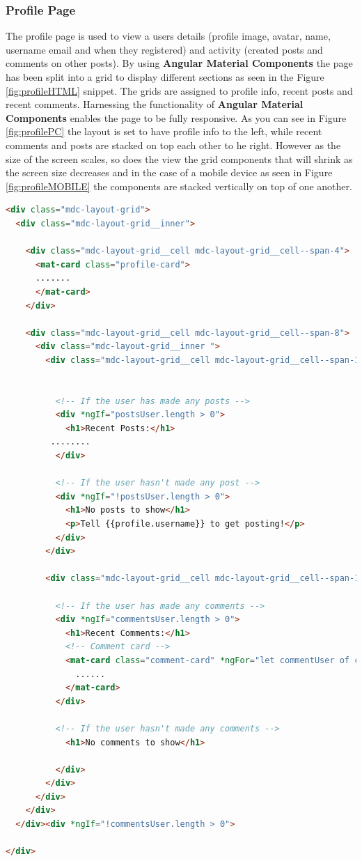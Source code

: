 \subsubsection{Profile Page} 
The profile page is used to view a users details (profile image, avatar, name, username email and when they registered) and activity (created posts and comments on other posts). By using \textbf{Angular Material Components} the page has been split into a grid to display different sections as seen in the Figure \ref{fig:profileHTML} snippet. The grids are assigned to profile info, recent posts and recent comments. Harnessing the functionality of \textbf{Angular Material Components} enables the page to be fully responsive. As you can see in Figure \ref{fig:profilePC} the layout is set to have profile info to the left, while recent comments and posts are stacked on top each other to he right. However as the size of the screen scales, so does the view the grid components that will shrink as the screen size decreases and in the case of a mobile device as seen in Figure \ref{fig:profileMOBILE} the components are stacked vertically on top of one another. 

\begin{lstlisting}[language=HTML,caption={Angular Material Component Grid},captionpos=b,label={fig:profileHTML}]
<div class="mdc-layout-grid">
  <div class="mdc-layout-grid__inner">

    <div class="mdc-layout-grid__cell mdc-layout-grid__cell--span-4">
      <mat-card class="profile-card">
      .......
      </mat-card>
    </div>

    <div class="mdc-layout-grid__cell mdc-layout-grid__cell--span-8">
      <div class="mdc-layout-grid__inner ">
        <div class="mdc-layout-grid__cell mdc-layout-grid__cell--span-12">


          <!-- If the user has made any posts -->
          <div *ngIf="postsUser.length > 0">
            <h1>Recent Posts:</h1>
         ........
          </div>

          <!-- If the user hasn't made any post -->
          <div *ngIf="!postsUser.length > 0">
            <h1>No posts to show</h1>
            <p>Tell {{profile.username}} to get posting!</p>
          </div>
        </div>
        
        <div class="mdc-layout-grid__cell mdc-layout-grid__cell--span-12">

          <!-- If the user has made any comments -->
          <div *ngIf="commentsUser.length > 0">
            <h1>Recent Comments:</h1>
            <!-- Comment card -->
            <mat-card class="comment-card" *ngFor="let commentUser of commentsUser">
              ......
            </mat-card>
          </div>

          <!-- If the user hasn't made any comments -->
            <h1>No comments to show</h1>

          </div>
        </div>
      </div>
    </div>
  </div><div *ngIf="!commentsUser.length > 0">
          
</div>
\end{lstlisting}

